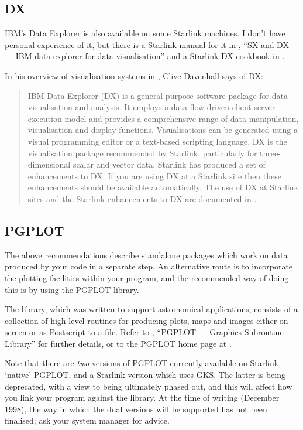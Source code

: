 \documentclass[11pt,oneside,chapters]{starlink}
\begin{document}
\subsection{DX}
\label{s:dx}

IBM's Data Explorer is also available on some Starlink
machines.  I don't have personal experience of it, but
there is a Starlink manual for it in
, ``SX and DX --- IBM data explorer
for data visualisation'' and a Starlink DX cookbook
in .

In his overview of visualisation systems in
, Clive Davenhall says of DX:

\begin{quotation}
IBM Data Explorer (DX) is a
general-purpose software package for data visualisation
and analysis. It employs a data-flow driven client-server
execution model and provides a comprehensive range of data
manipulation, visualisation and display functions.
Visualisations can be generated using a visual programming
editor or a text-based scripting language. DX is the
visualisation package recommended by Starlink,
particularly for three-dimensional scalar and vector
data. Starlink has produced a set of enhancements to
DX. If you are using DX at a Starlink site then these
enhancements should be available automatically. The use of
DX at Starlink sites and the Starlink enhancements to DX
are documented in
.
\end{quotation}


\subsection{PGPLOT}
\label{s:pgplot}

The above recommendations describe standalone packages
which work on data produced by your code in a separate
step.  An alternative route is to incorporate the plotting
facilities within your program, and the recommended way of
doing this is by using the PGPLOT library.

The library, which was written to support astronomical
applications, consists of a collection of high-level
routines for producing plots, maps and images either
on-screen or as Postscript to a file.  Refer to
, ``PGPLOT --- Graphics
Subroutine Library'' for further details, or to the
PGPLOT home page at \url{}.

Note that there are \emph{two} versions of PGPLOT
currently available on Starlink, `native' PGPLOT, and a
Starlink version which uses GKS.  The latter is being
deprecated, with a view to being ultimately phased out,
and this will affect how you link your program against the
library.  At the time of writing (December 1998), the way
in which the dual versions will be supported has not been
finalised; ask your system manager for advice.
\end{document}
